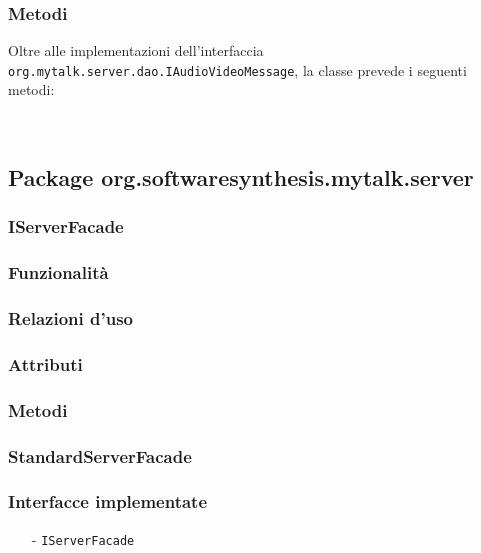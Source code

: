 \subsubsection*{Metodi}
Oltre alle implementazioni dell'interfaccia \texttt{org.mytalk.server.dao.IAudioVideoMessage}, la classe prevede i seguenti metodi:
\begin{description}
\item{}\\
\end{description}

\subsection{Package org.softwaresynthesis.mytalk.server}\label{sec:server}

\subsubsection{IServerFacade}\label{sec:iserverfacade}

\subsubsection*{Funzionalità}

\subsubsection*{Relazioni d'uso}

\subsubsection*{Attributi}

\subsubsection*{Metodi}

\subsubsection{StandardServerFacade}\label{sec:standardserverfacade}

\subsubsection*{Interfacce implementate}
\begin{itemize}[noitemsep,nolistsep]
  \item[-] \texttt{IServerFacade}
\end{itemize}

